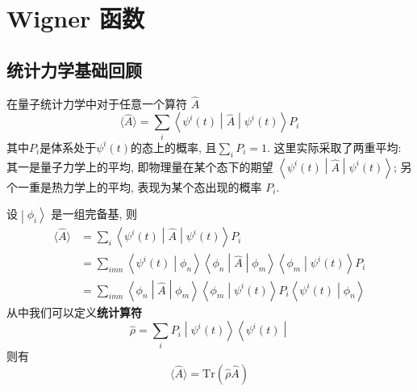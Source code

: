 \chapter{Wigner 函数}
    \section{统计力学基础回顾}

        在量子统计力学中对于任意一个算符 $\hat{A}$
        \begin{equation}
            \langle {\hat{A}} \rangle = \sum_i \left\langle {\psi^{i}(t)} \middle| {\hat{A}} \middle| {\psi^{i}(t)} \right\rangle P_{i}
        \end{equation}
        其中$P_i$是体系处于$\psi^{i}(t)$的态上的概率, 且$\sum_i P_i = 1$. 
        这里实际采取了两重平均: 其一是量子力学上的平均, 即物理量在某个态下的期望
        $\left\langle {\psi^{i}(t)} \middle| {\hat{A}} \middle| {\psi^{i}(t)} \right\rangle$; 
        另个一重是热力学上的平均, 表现为某个态出现的概率 $P_{i}$. 

        设$\left. \middle| {\phi_{i}} \right\rangle$ 是一组完备基, 则
        \begin{equation}\begin{aligned}
            \langle {\hat{A}} \rangle
            &= \sum_i \left\langle {\psi^{i}(t)} \middle| {\hat{A}} \middle| {\psi^{i}(t)} \right\rangle P_{i}
            \\
            &= \sum_{imn} \left\langle {\psi^{i}(t)} \middle| {\phi_{n}} \right\rangle \left\langle {\phi_{n}} \middle| {\hat{A}} \middle| {\phi_{m}} \right\rangle \left\langle {\phi_{m}} \middle| {\psi^{i}(t)} \right\rangle P_{i}
            \\
            &= \sum_{imn} \left\langle {\phi_{n}} \middle| {\hat{A}} \middle| {\phi_{m}} \right\rangle 
            \left\langle {\phi_{m}} \middle| {\psi^{i}(t)} \right\rangle P_{i}
            \left\langle {\psi^{i}(t)} \middle| {\phi_{n}} \right\rangle
        \end{aligned}\end{equation}
        从中我们可以定义\textbf{统计算符}
        \begin{equation}
            \hat{\rho} = \sum_i P_{i} \left. \middle| {\psi^{i}(t)} \right\rangle \left\langle {\psi^{i}(t)} \middle| \right.
        \end{equation}
        则有
        \begin{equation}
            \langle {\hat{A}} \rangle = \mathrm{Tr}(\hat{\rho}\hat{A})
        \end{equation}

